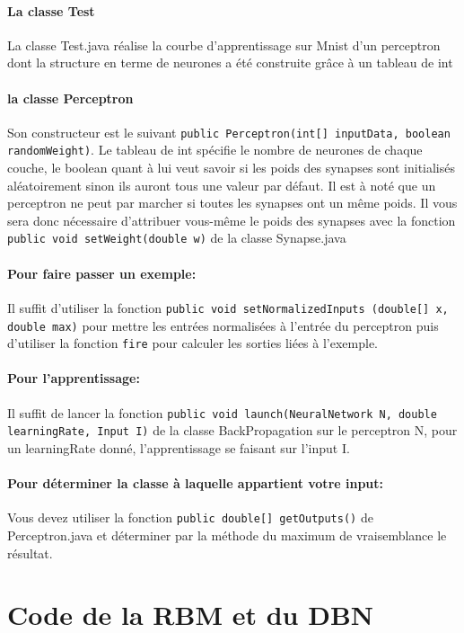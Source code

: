 \documentclass[a4paper,oneside]{report}
\begin{document}
\paragraph*{La classe Test} La classe Test.java réalise la courbe d'apprentissage sur Mnist d'un perceptron dont la structure en terme de neurones a été construite grâce à un tableau de int

\paragraph*{la classe Perceptron} Son constructeur est le suivant \texttt{public Perceptron(int[] inputData, boolean randomWeight)}. Le tableau de int spécifie le nombre de neurones de chaque couche, le boolean quant à lui veut savoir si les poids des synapses sont initialisés aléatoirement sinon ils auront tous une valeur par défaut. Il est à noté que un perceptron ne peut par marcher si toutes les synapses ont un même poids. Il vous sera donc nécessaire d'attribuer vous-même le poids des synapses avec la fonction \texttt{public void setWeight(double w)} de la classe Synapse.java

\paragraph*{Pour faire passer un exemple:} Il suffit d'utiliser la fonction \texttt{public void setNormalizedInputs (double[] x, double max)} pour mettre les entrées normalisées à l'entrée du perceptron puis d'utiliser la fonction \texttt{fire} pour calculer les sorties liées à l'exemple.

\paragraph*{Pour l'apprentissage: } Il suffit de lancer la fonction \texttt{public void launch(NeuralNetwork N, double learningRate, Input I)} de la classe BackPropagation sur le perceptron N, pour un learningRate donné, l'apprentissage se faisant sur l'input I.  

\paragraph*{Pour déterminer la classe à laquelle appartient votre input:} Vous devez utiliser la fonction \texttt{public double[] getOutputs()} de Perceptron.java et déterminer par la méthode du maximum de vraisemblance le résultat.

\section{Code de la RBM et du DBN}
\end{document}
